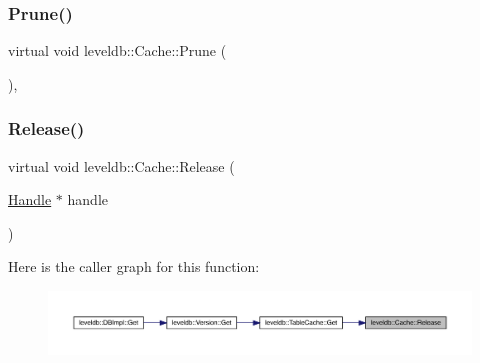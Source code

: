 \mbox{\label{classleveldb_1_1_cache_a2b517fe5e854f6923a357bffa1bb4fa3}} 
\subsubsection{\texorpdfstring{Prune()}{Prune()}}
{\footnotesize\ttfamily virtual void leveldb\+::\+Cache\+::\+Prune (\begin{DoxyParamCaption}{ }\end{DoxyParamCaption})\hspace{0.3cm}{\ttfamily [inline]}, {\ttfamily [virtual]}}

\mbox{\label{classleveldb_1_1_cache_a712618c8bf3bfa48b7bab1fbc23c3002}} 
\subsubsection{\texorpdfstring{Release()}{Release()}}
{\footnotesize\ttfamily virtual void leveldb\+::\+Cache\+::\+Release (\begin{DoxyParamCaption}\item[{\mbox{\hyperlink{structleveldb_1_1_cache_1_1_handle}{Handle}} $\ast$}]{handle }\end{DoxyParamCaption})\hspace{0.3cm}{\ttfamily [pure virtual]}}

Here is the caller graph for this function\+:
\nopagebreak
\begin{figure}[H]
\begin{center}
\leavevmode
\includegraphics[width=350pt]{classleveldb_1_1_cache_a712618c8bf3bfa48b7bab1fbc23c3002_icgraph}
\end{center}
\end{figure}
\mbox{\label{classleveldb_1_1_cache_a4ccef9422e919a7e5a1ffb64443f88ef}} 
